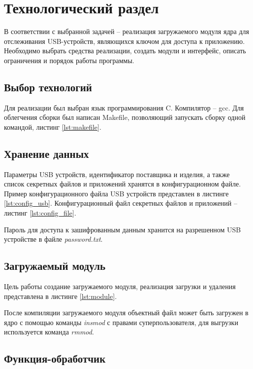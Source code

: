 \chapter{\textbf{Технологический раздел}}

\hfill

В соответствии с выбранной задачей -- реализация загружаемого модуля ядра для отслеживания USB-устройств, являющихся ключом для доступа к приложению. Необходимо выбрать средства реализации, создать модули и интерфейс, описать ограничения и порядок работы программы. 

\section{\textbf{Выбор технологий}}

Для реализации был выбран язык программирования C. Компилятор -- gcc. Для облегчения сборки был написан Makefile, позволяющий запускать сборку одной командой, листинг \ref{lst:makefile}.

\section{\textbf{Хранение данных }}

Параметры USB устройств, идентификатор поставщика и изделия, а также список секретных файлов и приложений хранятся в конфигурационном файле. Пример конфигурационного файла USB устройств представлен в листинге \ref{lst:config_usb}. Конфигурационный файл секретных файлов и приложений -- листинг \ref{lst:config_file}.

Пароль для доступа к зашифрованным данным хранится на разрешенном USB устройстве в файле \textit{password.txt}.

\section{\textbf{Загружаемый модуль}}

Цель работы создание загружаемого модуля, реализация загрузки и удаления представлена в листинге \ref{lst:module}.

После компиляции загружаемого модуля объектный файл может быть загружен в ядро с помощью команды \textit{insmod} с правами суперпользователя, для выгрузки используется команда \textit{rmmod}.

\section{\textbf{Функция-обработчик}}

